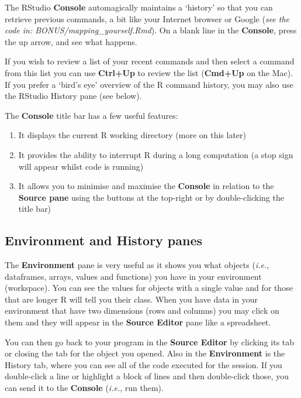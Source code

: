 \documentclass[]{book}
\theoremstyle{definition}
\theoremstyle{definition}
\theoremstyle{definition}
\theoremstyle{remark}
\begin{document}
The RStudio \textbf{Console} automagically maintains a `history' so that
you can retrieve previous commands, a bit like your Internet browser or
Google (\emph{see the code in: BONUS/mapping\_yourself.Rmd}). On a blank
line in the \textbf{Console}, press the up arrow, and see what happens.

If you wish to review a list of your recent commands and then select a
command from this list you can use \textbf{Ctrl+Up} to review the list
(\textbf{Cmd+Up} on the Mac). If you prefer a `bird's eye' overview of
the R command history, you may also use the RStudio History pane (see
below).

The \textbf{Console} title bar has a few useful features:

\begin{enumerate}
\def\labelenumi{\arabic{enumi}.}
\item
  It displays the current R working directory (more on this later)
\item
  It provides the ability to interrupt R during a long computation (a
  stop sign will appear whilst code is running)
\item
  It allows you to minimise and maximise the \textbf{Console} in
  relation to the \textbf{Source pane} using the buttons at the
  top-right or by double-clicking the title bar)
\end{enumerate}

\subsection{Environment and History
panes}\label{environment-and-history-panes}

The \textbf{Environment} pane is very useful as it shows you what
objects (\emph{i.e.}, dataframes, arrays, values and functions) you have
in your environment (workspace). You can see the values for objects with
a single value and for those that are longer R will tell you their
class. When you have data in your environment that have two dimensions
(rows and columns) you may click on them and they will appear in the
\textbf{Source Editor} pane like a spreadsheet.

You can then go back to your program in the \textbf{Source Editor} by
clicking its tab or closing the tab for the object you opened. Also in
the \textbf{Environment} is the History tab, where you can see all of
the code executed for the session. If you double-click a line or
highlight a block of lines and then double-click those, you can send it
to the \textbf{Console} (\emph{i.e.}, run them).
\end{document}
